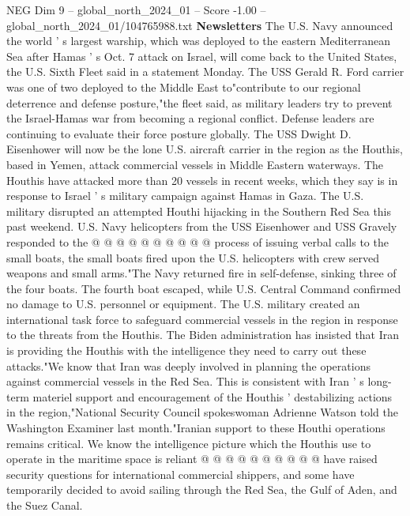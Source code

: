 \begin{textsample}{NEG Dim 9 – global\_north\_2024\_01 – Score -1.00 – global\_north\_2024\_01/104765988.txt}  \label{ex:f9_neg_195}
\textbf{Newsletters} The U.S.
Navy announced the world ' s largest warship, which was deployed to the eastern Mediterranean Sea after Hamas ' s Oct. 7 attack on Israel, will come back to the United States, the U.S.
Sixth Fleet said in a statement Monday.
The USS Gerald R.
Ford carrier was one of two deployed to the Middle East to"contribute to our regional deterrence and defense posture,"the fleet said, as military leaders try to prevent the Israel-Hamas war from becoming a regional conflict.
Defense leaders are continuing to evaluate their force posture globally.
The USS Dwight D.
Eisenhower will now be the lone U.S. aircraft carrier in the region as the Houthis, based in Yemen, attack commercial vessels in Middle Eastern waterways.
The Houthis have attacked more than 20 vessels in recent weeks, which they say is in response to Israel ' s military campaign against Hamas in Gaza.
The U.S. military disrupted an attempted Houthi hijacking in the Southern Red Sea this past weekend.
U.S.
Navy helicopters from the USS Eisenhower and USS Gravely responded to the @ @ @ @ @ @ @ @ @ @ process of issuing verbal calls to the small boats, the small boats fired upon the U.S. helicopters with crew served weapons and small arms."The Navy returned fire in self-defense, sinking three of the four boats.
The fourth boat escaped, while U.S.
Central Command confirmed no damage to U.S. personnel or equipment.
The U.S. military created an international task force to safeguard commercial vessels in the region in response to the threats from the Houthis.
The Biden administration has insisted that Iran is providing the Houthis with the intelligence they need to carry out these attacks."We know that Iran was deeply involved in planning the operations against commercial vessels in the Red Sea.
This is consistent with Iran ' s long-term materiel support and encouragement of the Houthis ' destabilizing actions in the region,"National Security Council spokeswoman Adrienne Watson told the Washington Examiner last month."Iranian support to these Houthi operations remains critical.
We know the intelligence picture which the Houthis use to operate in the maritime space is reliant @ @ @ @ @ @ @ @ @ @ have raised security questions for international commercial shippers, and some have temporarily decided to avoid sailing through the Red Sea, the Gulf of Aden, and the Suez Canal.

\end{textsample}
